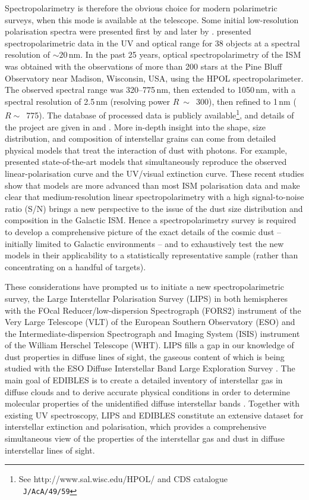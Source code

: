 \documentclass[a4paper]{aa}
\begin{document}
Spectropolarimetry is therefore the obvious choice for modern
polarimetric surveys, when this mode is available at the telescope.
Some initial low-resolution polarisation spectra were presented first
by \citet{WolNan71} and later by \citet{WolSmi84}.  \citet{Andetal96}
presented spectropolarimetric data in the UV and optical range for 38
objects at a spectral resolution of $\sim 20$\,nm. In the past 25
years, optical spectropolarimetry of the ISM was obtained with the
observations of more than 200 stars at the Pine Bluff Observatory near
Madison, Wisconsin, USA, using the HPOL spectropolarimeter. The
observed spectral range was 320--775\,nm, then extended to 1050\,nm,
with a spectral resolution of 2.5\,nm (resolving power $R~\sim$~300),
then refined to 1\,nm ($R \sim$~775). The database of processed data
is publicly available\footnote{See {http://www.sal.wisc.edu/HPOL/} and 
CDS catalogue\\ \ {\tt J/AcA/49/59}}, and
details of the project are given in \citet{Weitenbeck99} and
\citet{Meaetal12}.  More in-depth insight into the shape, size
distribution, and composition of interstellar grains can come from
detailed physical models that treat the interaction of dust with
photons. For example, \citet{Sieetal14} presented state-of-the-art models
that simultaneously reproduce the observed linear-polarisation curve
and the UV/visual extinction curve. These recent studies show that
models are more advanced than most ISM polarisation data and make
clear that medium-resolution linear
spectropolarimetry with a high signal-to-noise ratio (S/N) brings a new perspective to the issue of the dust
size distribution and composition in the Galactic ISM. Hence a
spectropolarimetry survey is required to develop a comprehensive
picture of the exact details of the cosmic dust -- initially limited
to Galactic environments -- and to exhaustively test the new models in
their applicability to a statistically representative sample (rather
than concentrating on a handful of targets).


These considerations have prompted us to initiate a new
spectropolarimetric survey, the Large Interstellar Polarisation Survey
(LIPS) in both hemispheres with the FOcal Reducer/low-dispersion
Spectrograph (FORS2) instrument of the Very Large Telescope (VLT) of
the European Southern Observatory (ESO) and the Intermediate-dispersion Spectrograph and Imaging System (ISIS) instrument of the
William Herschel Telescope (WHT). LIPS fills a gap in our knowledge of
dust properties in diffuse lines of sight, the gaseous content of which
is being studied with the ESO Diffuse Interstellar Band Large
Exploration Survey \citep[EDIBLES,][]{Coxetal17}.  The main
goal of EDIBLES is to create a detailed inventory of interstellar gas
in diffuse clouds and to derive accurate physical conditions in order
to determine molecular properties of the unidentified diffuse
interstellar bands \citep{Sarre06,CamCox14}.  Together with existing
UV spectroscopy, LIPS and EDIBLES constitute an extensive dataset for
interstellar extinction and polarisation, which provides a
comprehensive simultaneous view of the properties of the interstellar
gas and dust in diffuse interstellar lines of sight.
\end{document}
